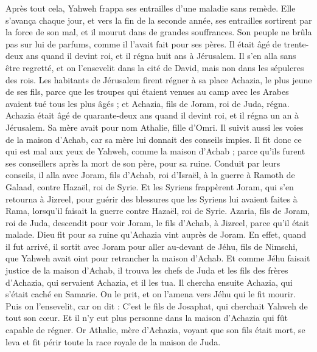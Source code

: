 \begin{multicols}{2}
Après tout cela, Yahweh frappa ses entrailles d'une maladie sans remède.
Elle s’avança chaque jour, et vers la fin de la seconde année, ses entrailles sortirent par la force de son mal, et il mourut dans de grandes souffrances. Son peuple ne brûla pas sur lui de parfums, comme il l’avait fait pour ses pères.
Il était âgé de trente-deux ans quand il devint roi, et il régna huit ans à Jérusalem. Il s'en alla sans être regretté, et on l'ensevelit dans la cité de David, mais non dans les sépulcres des rois.
\VerseOne{}Les habitants de Jérusalem firent régner à sa place Achazia, le plus jeune de ses fils, parce que les troupes qui étaient venues au camp avec les Arabes avaient tué tous les plus âgés ; et Achazia, fils de Joram, roi de Juda, régna.
Achazia était âgé de quarante-deux ans quand il devint roi, et il régna un an à Jérusalem. Sa mère avait pour nom Athalie, fille d'Omri.
Il suivit aussi les voies de la maison d'Achab, car sa mère lui donnait des conseils impies.
Il fit donc ce qui est mal aux yeux de Yahweh, comme la maison d'Achab ; parce qu'ils furent ses conseillers après la mort de son père, pour sa ruine.
Conduit par leurs conseils, il alla avec Joram, fils d'Achab, roi d'Israël, à la guerre à Ramoth de Galaad, contre Hazaël, roi de Syrie. Et les Syriens frappèrent Joram,
qui s'en retourna à Jizreel, pour guérir des blessures que les Syriens lui avaient faites à Rama, lorsqu'il faisait la guerre contre Hazaël, roi de Syrie. Azaria, fils de Joram, roi de Juda, descendit pour voir Joram, le fils d'Achab, à Jizreel, parce qu'il était malade.
Dieu fit pour sa ruine qu'Achazia vint auprès de Joram. En effet, quand il fut arrivé, il sortit avec Joram pour aller au-devant de Jéhu, fils de Nimschi, que Yahweh avait oint pour retrancher la maison d'Achab.
Et comme Jéhu faisait justice de la maison d'Achab, il trouva les chefs de Juda et les fils des frères d'Achazia, qui servaient Achazia, et il les tua.
Il chercha ensuite Achazia, qui s'était caché en Samarie. On le prit, et on l'amena vers Jéhu qui le fit mourir. Puis on l'ensevelit, car on dit : C'est le fils de Josaphat, qui cherchait Yahweh de tout son cœur. Et il n'y eut plus personne dans la maison d'Achazia qui fût capable de régner.
Or Athalie, mère d'Achazia, voyant que son fils était mort, se leva et fit périr toute la race royale de la maison de Juda.

\end{multicols}
